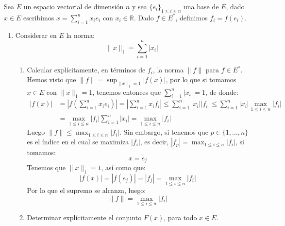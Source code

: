 \begin{ejercicio}
    Sea $E$ un espacio vectorial de dimensión $n$ y sea $\{e_i\}_{1\leq i \leq n}$ una base de $E$, dado $x\in E$ escribimos $x =\sum_{i=1}^{n}x_ie_i$ con $x_i\in \mathbb{R}$. Dado $f\in E^\ast$, definimos $f_i = f(e_i)$.
    \begin{enumerate}[label=\alph*)]
        \item Considerar en $E$ la norma:
            \begin{equation*}
                \|x\|_1 = \sum_{i=1}^{n}|x_i|
            \end{equation*}
            \begin{enumerate}
                \item Calcular explícitamente, en términos de $f_i$, la norma $\|f\|$ para $f\in E^\ast$.\\

                    Hemos visto que $\|f\| = \sup_{\|x\|_1=1}|f(x)|$, por lo que si tomamos $x\in E$ con $\|x\|_1=1$, tenemos entonces que $\sum_{i=1}^{n}|x_i| = 1$, de donde:
                    \begin{align*}
                        |f(x)| &= \left|f\left(\sum_{i=1}^{n}x_ie_i\right)\right| = \left|\sum_{i=1}^{n}x_if_i\right| \leq \sum_{i=1}^{n}|x_i||f_i|  \leq \sum_{i=1}^{n}|x_i|\max_{1\leq i \leq n}|f_i| \\
                               &= \max_{1\leq i\leq n}|f_i| \sum_{i=1}^{n}|x_i| = \max_{1\leq i\leq n}|f_i|
                    \end{align*}
                    Luego $\|f\|\leq \max_{1\leq i\leq n}|f_i|$. Sin embargo, si tenemos que $p\in \{1,\ldots,n\}$ es el índice en el cual se maximiza $|f_i|$, es decir, $|f_p| = \max_{1\leq i\leq n}|f_i|$, si tomamos:
                    \begin{equation*}
                        x = e_j
                    \end{equation*}
                    Tenemos que $\|x\|_1=1$, así como que:
                    \begin{equation*}
                        |f(x)| = |f(e_j)| = |f_j| = \max_{1\leq i \leq n}|f_i|
                    \end{equation*}
                    Por lo que el supremo se alcanza, luego:
                    \begin{equation*}
                        \|f\| = \max_{1\leq i \leq n}|f_i|
                    \end{equation*}
                \item Determinar explícitamente el conjunto $F(x)$, para todo $x\in E$.


\end{enumerate}
\end{enumerate}
\end{ejercicio}
